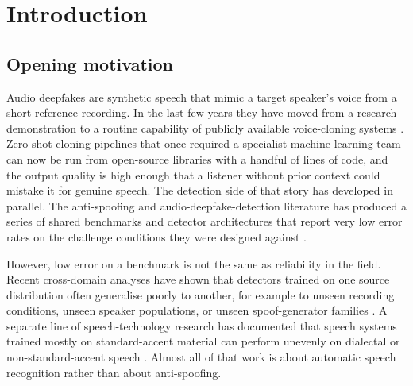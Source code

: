 \cleardoubleoddpage
\chapter{Introduction}
\label{chap:introduction}



\section{Opening motivation}
\label{sec:introduction-motivation}

Audio deepfakes are synthetic speech that mimic a target speaker's
voice from a short reference recording. In the last few years they
have moved from a research demonstration to a routine capability of
publicly available voice-cloning systems
\cite{Casanova2024_XTTS} \cite{Qin2023_OpenVoice}. Zero-shot cloning
pipelines that once required a specialist machine-learning team can
now be run from open-source libraries with a handful of lines of
code, and the output quality is high enough that a listener without
prior context could mistake it for genuine speech. The detection
side of that story has developed in parallel. The anti-spoofing and
audio-deepfake-detection literature has produced a series of shared
benchmarks and detector architectures that report very low error
rates on the challenge conditions they were designed against
\cite{Todisco2019_ASVspoof} \cite{Yamagishi2021_ASVspoof2021}
\cite{Yi2022_ADD}.

However, low error on a benchmark is not the same as reliability in
the field. Recent cross-domain analyses have shown that detectors
trained on one source distribution often generalise poorly to
another, for example to unseen recording conditions, unseen speaker
populations, or unseen spoof-generator families
\cite{Li2024_CrossDomainADD} \cite{Muller2024_HarderDifferent}. A
separate line of speech-technology research has documented that
speech systems trained mostly on standard-accent material can
perform unevenly on dialectal or non-standard-accent speech
\cite{Koenecke2020_ASRDisparities} \cite{Serditova2025_NewcastleASR}.
Almost all of that work is about automatic speech recognition
rather than about anti-spoofing.


